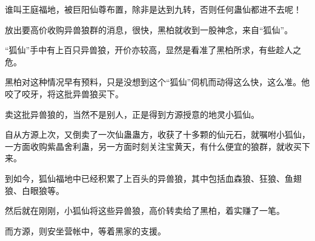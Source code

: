 \begin{this_body}
谁叫王庭福地，被巨阳仙尊布置，除非是达到九转，否则任何蛊仙都进不去呢！

放出要高价收购异兽狼群的消息，很快，黑柏就收到一股神念，来自“狐仙”。

“狐仙”手中有上百只异兽狼，开价亦较高，显然是看准了黑柏所求，有些趁人之危。

黑柏对这种情况早有预料，只是没想到这个“狐仙”伺机而动得这么快，这么准。他咬了咬牙，将这批异兽狼买下。

卖这批异兽狼的，当然不是别人，正是得到方源授意的地灵小狐仙。

自从方源上次，又倒卖了一次仙蛊蛊方，收获了十多颗的仙元石，就嘱咐小狐仙，一方面收购紫晶舍利蛊，另一方面时刻关注宝黄天，有什么便宜的狼群，就收买下来。

到如今，狐仙福地中已经积累了上百头的异兽狼，其中包括血森狼、狂狼、鱼翅狼、白眼狼等。

然后就在刚刚，小狐仙将这些异兽狼，高价转卖给了黑柏，着实赚了一笔。

而方源，则安坐营帐中，等着黑家的支援。

\end{this_body}

